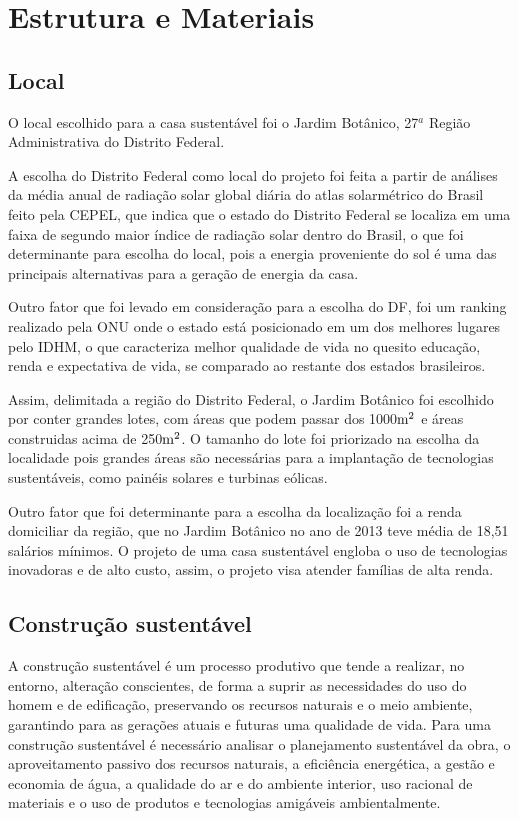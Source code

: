 \section{Estrutura e Materiais}

\subsection{Local}
	O local escolhido para a casa sustentável foi o Jardim Botânico, 27$^a$ Região Administrativa do Distrito Federal.

	A escolha do Distrito Federal como local do projeto foi feita a partir de análises da média anual de radiação solar global diária do atlas solarmétrico do Brasil feito pela \gls{CEPEL}, que indica que o estado do Distrito Federal se localiza em uma faixa de segundo maior índice de radiação solar dentro do Brasil, o que foi determinante para escolha do local, pois a energia proveniente do sol é uma das principais alternativas para a geração de energia da casa.

	Outro fator que foi levado em consideração para a escolha do DF, foi um ranking realizado pela \gls{ONU} onde o estado está posicionado em um dos melhores lugares pelo \gls{IDHM}, o que caracteriza melhor qualidade de vida no quesito educação, renda e expectativa de vida, se comparado ao restante dos estados brasileiros.

	Assim, delimitada a região do Distrito Federal, o Jardim Botânico foi escolhido por conter grandes lotes, com áreas que podem passar dos 1000$\textup{m}^{2}$\cite{5298d86a7fd17} e áreas construidas acima de 250$\textup{m}^{2}$\cite{PDAD}. O tamanho do lote foi priorizado na escolha da localidade pois grandes áreas são necessárias para a implantação de tecnologias sustentáveis, como painéis solares e turbinas eólicas. 

	Outro fator que foi determinante para a escolha da localização foi a renda domiciliar da região, que no Jardim Botânico no ano de 2013 teve média de 18,51 salários mínimos\cite{pesquisa_socioeconomica}. O projeto de uma casa sustentável engloba o uso de tecnologias inovadoras e de alto custo, assim, o projeto visa atender famílias de alta renda.

\subsection{Construção sustentável}

	A construção sustentável é um processo produtivo que tende a realizar, no entorno, alteração conscientes, de forma a suprir as necessidades do uso do homem e de edificação, preservando os recursos naturais e o meio ambiente, garantindo para as gerações atuais e futuras uma qualidade de vida.\cite{Baroni1992} Para uma construção sustentável é necessário analisar o planejamento sustentável da obra, o aproveitamento passivo dos recursos naturais, a eficiência energética, a gestão e economia de água, a qualidade do ar e do ambiente interior, uso racional de materiais e o uso de produtos e tecnologias amigáveis ambientalmente.\cite{Araujo2012}

